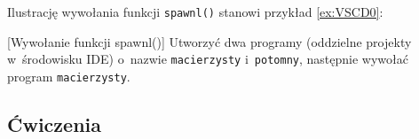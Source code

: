 Ilustrację wywołania funkcji \texttt{spawnl()} stanowi przykład \ref{ex:VSCD0}:
\begin{example}{[Wywołanie funkcji spawnl()]}
  \label{ex:VSCD0}
  Utworzyć dwa programy (oddzielne projekty w~środowisku IDE) o~nazwie
  \texttt{macierzysty} i~\texttt{potomny}, następnie wywołać program
  \texttt{macierzysty}.
  
  
\end{example}


\subsection{Ćwiczenia}

